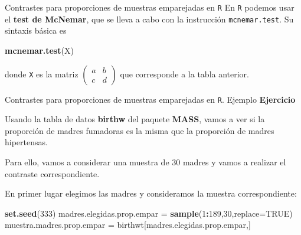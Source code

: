 \documentclass[
  ignorenonframetext,
]{beamer}
\newenvironment{Shaded}{\begin{snugshade}}{\end{snugshade}}
\newcommand{\DataTypeTok}[1]{\textcolor[rgb]{0.13,0.29,0.53}{#1}}
\newcommand{\DecValTok}[1]{\textcolor[rgb]{0.00,0.00,0.81}{#1}}
\newcommand{\KeywordTok}[1]{\textcolor[rgb]{0.13,0.29,0.53}{\textbf{#1}}}
\newcommand{\NormalTok}[1]{#1}
\newcommand{\OperatorTok}[1]{\textcolor[rgb]{0.81,0.36,0.00}{\textbf{#1}}}
\newcommand{\OtherTok}[1]{\textcolor[rgb]{0.56,0.35,0.01}{#1}}
\newcommand{\StringTok}[1]{\textcolor[rgb]{0.31,0.60,0.02}{#1}}
\begin{document}
\begin{frame}[fragile]{Contrastes para proporciones de muestras
emparejadas en \texttt{R}}
\protect\hypertarget{contrastes-para-proporciones-de-muestras-emparejadas-en-r}{}
En \texttt{R} podemos usar el \textbf{test de McNemar}, que se lleva a
cabo con la instrucción \texttt{mcnemar.test}. Su sintaxis básica es

\begin{Shaded}
\begin{Highlighting}[]
\KeywordTok{mcnemar.test}\NormalTok{(X)}
\end{Highlighting}
\end{Shaded}

donde \texttt{X} es la matriz
\(\left(\begin{array}{cc} a & b\\ c& d \end{array}\right)\) que
corresponde a la tabla anterior.
\end{frame}

\begin{frame}[fragile]{Contrastes para proporciones de muestras
emparejadas en \texttt{R}. Ejemplo}
\protect\hypertarget{contrastes-para-proporciones-de-muestras-emparejadas-en-r.-ejemplo}{}
\textbf{Ejercicio}

Usando la tabla de datos \textbf{birthw} del paquete \textbf{MASS},
vamos a ver si la proporción de madres fumadoras es la misma que la
proporción de madres hipertensas.

Para ello, vamos a considerar una muestra de 30 madres y vamos a
realizar el contraste correspondiente.

En primer lugar elegimos las madres y consideramos la muestra
correspondiente:

\begin{Shaded}
\begin{Highlighting}[]
\KeywordTok{set.seed}\NormalTok{(}\DecValTok{333}\NormalTok{)}
\NormalTok{madres.elegidas.prop.empar =}\StringTok{ }\KeywordTok{sample}\NormalTok{(}\DecValTok{1}\OperatorTok{:}\DecValTok{189}\NormalTok{,}\DecValTok{30}\NormalTok{,}\DataTypeTok{replace=}\OtherTok{TRUE}\NormalTok{)}
\NormalTok{muestra.madres.prop.empar =}\StringTok{ }\NormalTok{birthwt[madres.elegidas.prop.empar,]}
\end{Highlighting}
\end{Shaded}
\end{frame}
\end{document}
